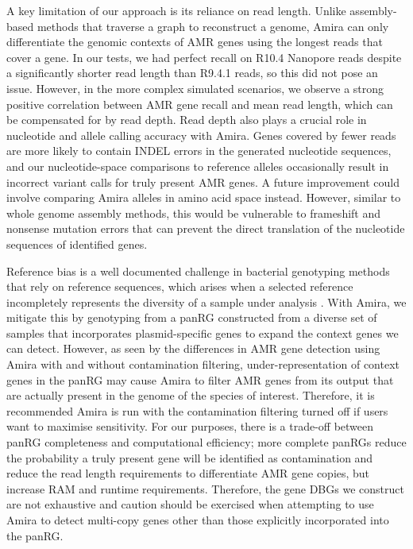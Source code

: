 A key limitation of our approach is its reliance on read length. Unlike assembly-based methods that traverse a graph to reconstruct a genome, Amira can only differentiate the genomic contexts of AMR genes using the longest reads that cover a gene. In our tests, we had perfect recall on R10.4 Nanopore reads despite a significantly shorter read length than R9.4.1 reads, so this did not pose an issue. However, in the more complex simulated scenarios, we observe a strong positive correlation between AMR gene recall and mean read length, which can be compensated for by read depth. Read depth also plays a crucial role in nucleotide and allele calling accuracy with Amira. Genes covered by fewer reads are more likely to contain INDEL errors in the generated nucleotide sequences, and our nucleotide-space comparisons to reference alleles occasionally result in incorrect variant calls for truly present AMR genes. A future improvement could involve comparing Amira alleles in amino acid space instead. However, similar to whole genome assembly methods, this would be vulnerable to frameshift and nonsense mutation errors that can prevent the direct translation of the nucleotide sequences of identified genes.

Reference bias is a well documented challenge in bacterial genotyping methods that rely on reference sequences, which arises when a selected reference incompletely represents the diversity of a sample under analysis  \cite{pandora, 10.1016/s2666-52472100149-x, panaroo}. With Amira, we mitigate this by genotyping from a panRG constructed from a diverse set of samples that incorporates plasmid-specific genes to expand the context genes we can detect. However, as seen by the differences in AMR gene detection using Amira with and without contamination filtering, under-representation of context genes in the panRG may cause Amira to filter AMR genes from its output that are actually present in the genome of the species of interest. Therefore, it is recommended Amira is run with the contamination filtering turned off if users want to maximise sensitivity. For our purposes, there is a trade-off between panRG completeness and computational efficiency; more complete panRGs reduce the probability a truly present gene will be identified as contamination and reduce the read length requirements to differentiate AMR gene copies, but increase RAM and runtime requirements. Therefore, the gene DBGs we construct are not exhaustive and caution should be exercised when attempting to use Amira to detect multi-copy genes other than those explicitly incorporated into the panRG. 

